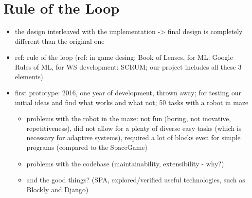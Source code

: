 \section{Rule of the Loop}
\label{sec:robomission.rule-of-the-loop}

\begin{itemize}
\item the design interleaved with the implementation -> final design is completely different than the original one
\item ref: rule of the loop (ref: in game desing: Book of Lenses, for ML: Google Rules of ML, for WS development: SCRUM; our project includes all these 3 elements)
\item first prototype: 2016, one year of development, thrown away; for testing our initial ideas and find what works and what not; 50 tasks with a robot in maze
  \begin{itemize}
  \item problems with the robot in the maze: not fun (boring, not inovative, repetitiveness), did not allow for a plenty of diverse easy tasks (which is necessary for adaptive systems), required a lot of blocks even for simple programs (compared to the SpaceGame)
  \item problems with the codebase (maintainability, extensibility - why?)
  \item and the good things? (SPA, explored/verified useful technologies, such as Blockly and Django)
  \end{itemize}
\end{itemize}

